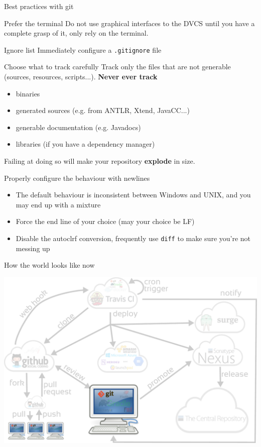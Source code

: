 \documentclass[presentation]{beamer}
\begin{document}
\begin{frame}{Best practices with git}
	\begin{block}{Prefer the terminal}
		Do not use graphical interfaces to the DVCS until you have a complete grasp of it, only rely on the terminal.
	\end{block}
	\begin{block}{Ignore list}
		Immediately configure a \texttt{.gitignore} file
	\end{block}
	\begin{block}{Choose what to track carefully}
		Track only the files that are not generable (sources, resources, scripts...). \textbf{Never ever track}
		\begin{itemize}
			\item binaries
			\item generated sources (e.g. from ANTLR, Xtend, JavaCC...)
			\item generable documentation (e.g. Javadocs)
			\item libraries (if you have a dependency manager)
		\end{itemize}
		Failing at doing so will make your repository \textbf{explode} in size.
	\end{block}
	\begin{block}{Properly configure the behaviour with newlines}
		\begin{itemize}
			\item The default behaviour is inconsistent between Windows and UNIX, and you may end up with a mixture
			\item Force the end line of your choice (may your choice be LF)
			\item Disable the autoclrf conversion, frequently use \texttt{diff} to make sure you're not messing up
		\end{itemize}
	\end{block}
\end{frame}

\begin{frame}[fragile]{How the world looks like now}
	\begin{center}
		\includegraphics[width=.9\textwidth]{images/ci-git}
	\end{center}
\end{frame}
\end{document}
